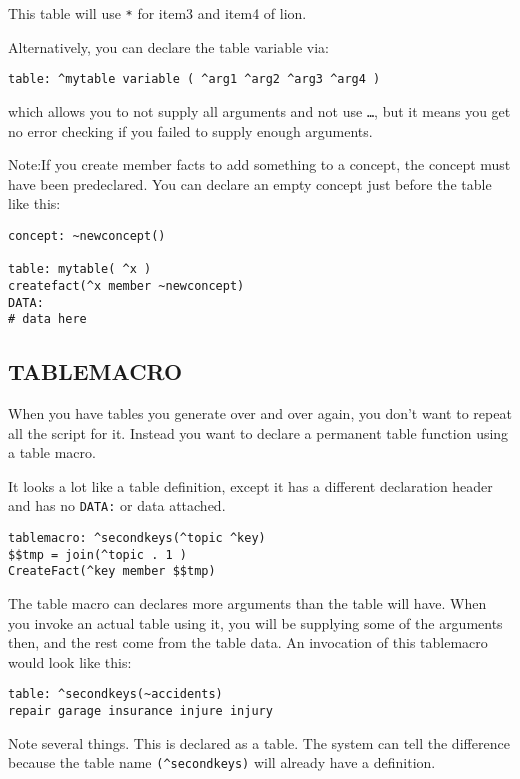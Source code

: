 \documentclass[]{article}
\begin{document}
This table will use \texttt{*} for item3 and item4 of lion.

Alternatively, you can declare the table variable via:

\begin{verbatim}
table: ^mytable variable ( ^arg1 ^arg2 ^arg3 ^arg4 )
\end{verbatim}

which allows you to not supply all arguments and not use
\texttt{\ldots{}}, but it means you get no error checking if you failed
to supply enough arguments.

Note:If you create member facts to add something to a concept, the
concept must have been predeclared. You can declare an empty concept
just before the table like this:

\begin{verbatim}
concept: ~newconcept()

table: mytable( ^x )
createfact(^x member ~newconcept)
DATA:
# data here
\end{verbatim}

\subsection{TABLEMACRO}\label{tablemacro}

When you have tables you generate over and over again, you don't want to
repeat all the script for it. Instead you want to declare a permanent
table function using a table macro.

It looks a lot like a table definition, except it has a different
declaration header and has no \texttt{DATA:} or data attached.

\begin{verbatim}
tablemacro: ^secondkeys(^topic ^key)
$$tmp = join(^topic . 1 )
CreateFact(^key member $$tmp)
\end{verbatim}

The table macro can declares more arguments than the table will have.
When you invoke an actual table using it, you will be supplying some of
the arguments then, and the rest come from the table data. An invocation
of this tablemacro would look like this:

\begin{verbatim}
table: ^secondkeys(~accidents)
repair garage insurance injure injury
\end{verbatim}

Note several things. This is declared as a table. The system can tell
the difference because the table name \texttt{(\^{}secondkeys)} will
already have a definition.
\end{document}
